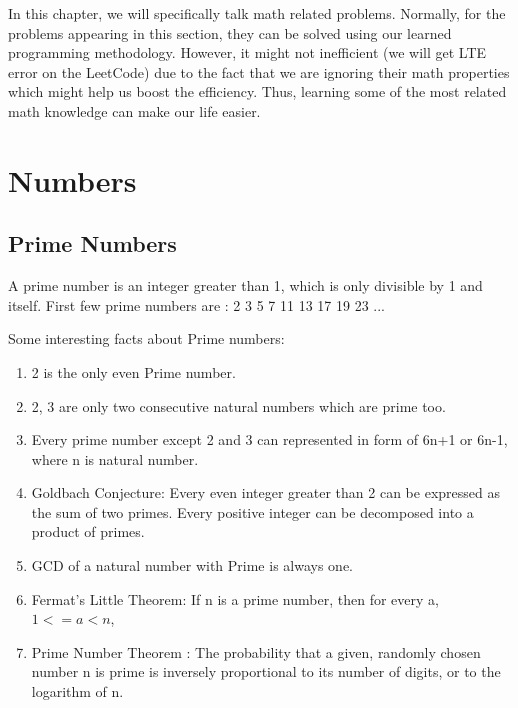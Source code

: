 \documentclass[../main.tex]{subfiles}
\begin{document}
In this chapter, we will specifically talk math related problems. Normally, for the problems appearing in this section, they can be solved using our learned programming methodology. However, it might not inefficient (we will get LTE error on the LeetCode) due to the fact that we are ignoring their math properties which might help us boost the efficiency. Thus, learning some of the most related math knowledge can make our life easier. 


\section{Numbers}
\subsection{Prime Numbers}
A prime number is an integer greater than 1, which is only divisible by 1 and itself. First few prime numbers are : 2 3 5 7 11 13 17 19 23 ...

Some interesting facts about Prime numbers: 
\begin{enumerate}
    \item 2 is the only even Prime number.
    \item  2, 3 are only two consecutive natural numbers which are prime too.
    \item \label{divide}Every prime number except 2 and 3 can represented in form of 6n+1 or 6n-1, where n is natural number.
    \item \label{godld} Goldbach Conjecture: Every even integer greater than 2 can be expressed as the sum of two primes. Every positive integer can be decomposed into a product of primes.
    \item GCD of a natural number with Prime is always one.
    \item Fermat’s Little Theorem: If n is a prime number, then for every a, $1 <= a < n $, %
    \item Prime Number Theorem : The probability that a given, randomly chosen number n is prime is inversely proportional to its number of digits, or to the logarithm of n.
\end{enumerate}
\end{document}
